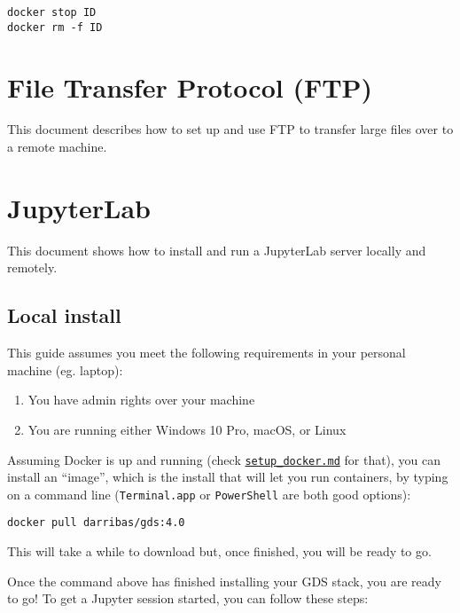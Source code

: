 \documentclass[
]{book}
\providecommand{\tightlist}{%
  \setlength{\itemsep}{0pt}\setlength{\parskip}{0pt}}
\begin{document}
\begin{verbatim}
docker stop ID
docker rm -f ID
\end{verbatim}

\hypertarget{file-transfer-protocol-ftp}{%
\chapter{File Transfer Protocol (FTP)}\label{file-transfer-protocol-ftp}}

This document describes how to set up and use FTP to transfer large files over
to a remote machine.

\hypertarget{jupyterlab}{%
\chapter{JupyterLab}\label{jupyterlab}}

This document shows how to install and run a JupyterLab server locally and
remotely.

\hypertarget{local-install}{%
\section{Local install}\label{local-install}}

This guide assumes you meet the following requirements in your personal
machine (eg. laptop):

\begin{enumerate}
\def\labelenumi{\arabic{enumi}.}
\tightlist
\item
  You have admin rights over your machine
\item
  You are running either Windows 10 Pro, macOS, or Linux
\end{enumerate}

Assuming Docker is up and running (check \href{setup_docker.md}{\texttt{setup\_docker.md}}
for that), you can install an ``image'', which is the install that will let you
run containers, by typing on a command line (\texttt{Terminal.app} or \texttt{PowerShell}
are both good options):

\begin{verbatim}
docker pull darribas/gds:4.0
\end{verbatim}

This will take a while to download but, once finished, you will be ready
to go.

Once the command above has finished installing your GDS stack, you are ready to go! To get a Jupyter session started, you can follow these steps:
\end{document}
